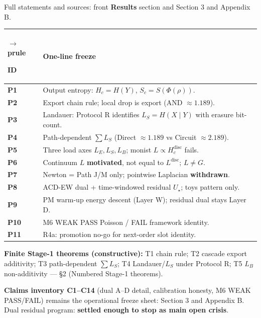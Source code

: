\documentclass[
  11pt,
]{article}
\newcounter{none} %
\begin{document}
Full statements and sources: front \textbf{Results} section and Section 3 and Appendix B.

{\def\LTcaptype{none} %
\begin{longtable}[]{@{}
  >{\raggedright\arraybackslash}p{}
  >{\raggedright\arraybackslash}p{}@{}}
$\rightarrow$prule\noalign{}
\begin{minipage}[b]{\linewidth}\raggedright
ID
\end{minipage} & \begin{minipage}[b]{\linewidth}\raggedright
One-line freeze
\end{minipage} \\
\midrule\noalign{}
\endhead
\bottomrule\noalign{}
\endlastfoot
\textbf{P1} & Output entropy: \(H_c=H(Y)\), \(S_c=S(\Phi(\rho))\). \\
\textbf{P2} & Export chain rule; local drop is export (AND \(\approx 1.189\)). \\
\textbf{P3} & Landauer: Protocol R identifies \(L_S=H(X\mid Y)\) with erasure bit-count. \\
\textbf{P4} & Path-dependent \(\sum L_S\) (Direct \(\approx 1.189\) vs Circuit \(\approx 2.189\)). \\
\textbf{P5} & Three load axes \(L_E,L_S,L_B\); monist \(L\propto H_c^{\mathrm{disc}}\) fails. \\
\textbf{P6} & Continuum \(L\) \textbf{motivated}, not equal to \(L^{\mathrm{disc}}\); \(L\neq G\). \\
\textbf{P7} & Newton = Path J/M only; pointwise Laplacian \textbf{withdrawn}. \\
\textbf{P8} & ACD-EW dual + time-windowed residual \(U_\star\); toys pattern only. \\
\textbf{P9} & PM warm-up energy descent (Layer W); residual dual stays Layer D. \\
\textbf{P10} & M6 WEAK PASS Poisson / FAIL framework identity. \\
\textbf{P11} & R4a: promotion no-go for next-order slot identity. \\
\end{longtable}
}

\textbf{Finite Stage-1 theorems (constructive):} T1 chain rule; T2 cascade export additivity; T3 path-dependent \(\sum L_S\); T4 Landauer/\(L_S\) under Protocol R; T5 \(L_B\) non-additivity --- \S2 (Numbered Stage-1 theorems).

\textbf{Claims inventory C1--C14} (dual A--D detail, calibration honesty, M6 WEAK PASS/FAIL) remains the operational freeze sheet: Section 3 and Appendix B. Dual residual program: \textbf{settled enough to stop as main open crisis}.
\end{document}
